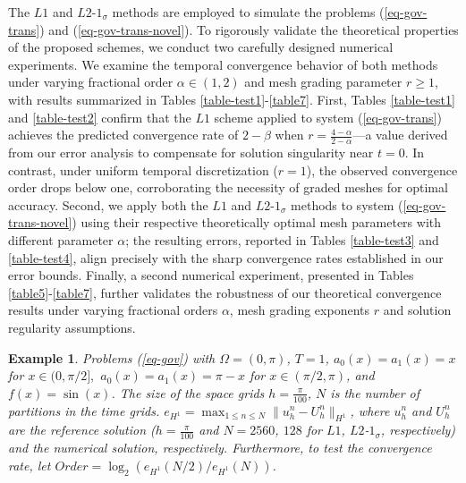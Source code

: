 \documentclass[11pt]{article}
\newtheorem{remark}{Remark}[section]
\newtheorem{example}{Example}
\numberwithin{equation}{section}
\begin{document}
The $L1$ and $L2$-$1_\sigma$ methods are employed to simulate the problems (\ref{eq-gov-trans}) and (\ref{eq-gov-trans-novel}). To rigorously validate the theoretical properties of the proposed schemes, we conduct two carefully designed numerical experiments. We examine the temporal convergence behavior of both methods under varying fractional order $\alpha \in (1,2)$ and mesh grading parameter $r\geq 1$, with results summarized in Tables \ref{table-test1}-\ref{table7}. First, Tables \ref{table-test1} and \ref{table-test2} confirm that the $L1$ scheme applied to system (\ref{eq-gov-trans}) achieves the predicted convergence rate of $2-\beta$ when $r = \frac{4-\alpha}{2-\alpha}$—a value derived from our error analysis to compensate for solution singularity near $t=0$. In contrast, under uniform temporal discretization ($r=1$), the observed convergence order drops below one, corroborating the necessity of graded meshes for optimal accuracy. Second, we apply both the $L1$ and $L2$-$1_\sigma$ methods to system (\ref{eq-gov-trans-novel}) using their respective theoretically optimal mesh parameters with different parameter $\alpha$; the resulting errors, reported in Tables \ref{table-test3} and \ref{table-test4}, align precisely with the sharp convergence rates established in our error bounds. Finally, a second numerical experiment, presented in Tables \ref{table5}-\ref{table7}, further validates the robustness of our theoretical convergence results under varying fractional orders $\alpha$, mesh grading exponents $r$ and solution regularity assumptions.

\begin{example}\label{ex-test}
Problems (\ref{eq-gov}) with $\Omega=(0,\pi)$, $T=1$, 
$a_0(x)=a_1(x)=x$ for $x\in(0,\pi/2],$ $a_0(x)=a_1(x)=\pi-x$ for $x\in(\pi/2,\pi)$, and $f(x)=\sin(x)$.
The size of the space grids $h=\frac{\pi}{100}$, $N$ is the number of partitions in the time
grids. $e_{H^1}=\max_{1\leq n\leq N}\|u_h^n-U_h^n\|_{H^1}$, where $u_h^n$ and $U_h^n$ are the reference solution ($h=\frac{\pi} {100}$ and $N=2560$, $128$ for $L1$, $L2$-$1_\sigma$, respectively) and the numerical solution, respectively. Furthermore, to test the convergence rate, let $Order=\log_2(e_{H^1}(N/2)/e_{H^1}(N))$.
\end{example}
\end{document}

